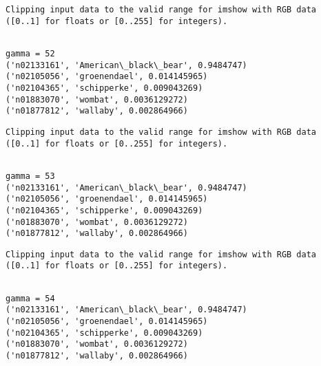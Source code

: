 \documentclass[11pt]{article}
\begin{document}
    \begin{Verbatim}[commandchars=\\\{\}]
Clipping input data to the valid range for imshow with RGB data ([0..1] for floats or [0..255] for integers).

    \end{Verbatim}

    \begin{Verbatim}[commandchars=\\\{\}]

gamma = 52
('n02133161', 'American\_black\_bear', 0.9484747)
('n02105056', 'groenendael', 0.014145965)
('n02104365', 'schipperke', 0.009043269)
('n01883070', 'wombat', 0.0036129272)
('n01877812', 'wallaby', 0.002864966)

    \end{Verbatim}

    \begin{Verbatim}[commandchars=\\\{\}]
Clipping input data to the valid range for imshow with RGB data ([0..1] for floats or [0..255] for integers).

    \end{Verbatim}

    \begin{Verbatim}[commandchars=\\\{\}]

gamma = 53
('n02133161', 'American\_black\_bear', 0.9484747)
('n02105056', 'groenendael', 0.014145965)
('n02104365', 'schipperke', 0.009043269)
('n01883070', 'wombat', 0.0036129272)
('n01877812', 'wallaby', 0.002864966)

    \end{Verbatim}

    \begin{Verbatim}[commandchars=\\\{\}]
Clipping input data to the valid range for imshow with RGB data ([0..1] for floats or [0..255] for integers).

    \end{Verbatim}

    \begin{Verbatim}[commandchars=\\\{\}]

gamma = 54
('n02133161', 'American\_black\_bear', 0.9484747)
('n02105056', 'groenendael', 0.014145965)
('n02104365', 'schipperke', 0.009043269)
('n01883070', 'wombat', 0.0036129272)
('n01877812', 'wallaby', 0.002864966)

    \end{Verbatim}
\end{document}
